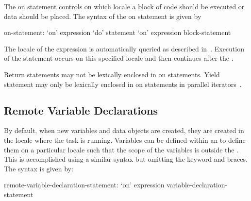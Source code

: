 The on statement controls on which locale a block of code should be
executed or data should be placed.  The syntax of the on statement is
given by
\begin{syntax}
on-statement:
  `on' expression `do' statement
  `on' expression block-statement
\end{syntax}
The locale of the expression is automatically queried as described
in~.  Execution of the
statement occurs on this specified locale and then continues after
the .

Return statements may not be lexically enclosed in on statements.
Yield statement may only be lexically enclosed in on statements in
parallel iterators~.

\subsection{Remote Variable Declarations}
\label{remote_variable_declarations}

By default, when new variables and data objects are created, they are
created in the locale where the task is running.  Variables can be
defined within an  to define them on a particular
locale such that the scope of the variables is outside
the .  This is accomplished using a similar syntax
but omitting the  keyword and braces.  The syntax is given
by:
\begin{syntax}
remote-variable-declaration-statement:
  `on' expression variable-declaration-statement
\end{syntax}
